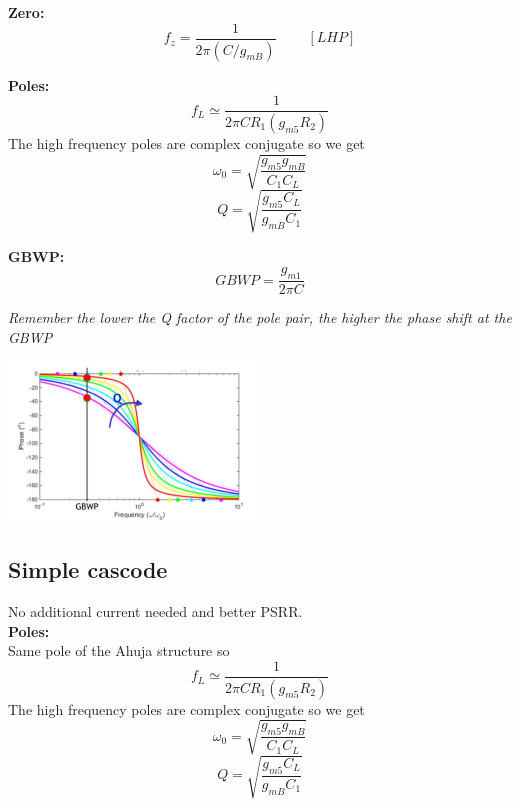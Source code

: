 {\bf Zero:}\\
\begin{equation}
f_z=\frac{1}{2\pi(C/g_{mB})}\ \ \ \ \ \ \ \ \ \ [LHP]
\end{equation}

{\bf Poles:}\\
\begin{equation}
f_L\simeq \frac{1}{2\pi CR_1(g_{m5}R_2)}
\end{equation}
The high frequency poles are complex conjugate so we get\\
\begin{equation}
\omega_0=\sqrt{\frac{g_{m5}g_{mB}}{C_1C_L}}
\end{equation}
\begin{equation}
Q=\sqrt{\frac{g_{m5}C_L}{g_{mB}C_1}}
\end{equation}

{\bf GBWP:}
\begin{equation}
GBWP=\frac{g_{m1}}{2\pi C}
\end{equation}

{\it Remember the lower the Q factor of the pole pair, the higher the phase shift at the GBWP}

\centering
\includegraphics[width=0.5\textwidth]{Qfactor.png}\\
\raggedright

\subsection{Simple cascode}
No additional current needed and better PSRR.\\

{\bf Poles:}\\
Same pole of the Ahuja structure so
\begin{equation}
f_L\simeq \frac{1}{2\pi CR_1(g_{m5}R_2)}
\end{equation}
The high frequency poles are complex conjugate so we get\\
\begin{equation}
\omega_0=\sqrt{\frac{g_{m5}g_{mB}}{C_1C_L}}
\end{equation}
\begin{equation}
Q=\sqrt{\frac{g_{m5}C_L}{g_{mB}C_1}}
\end{equation}

